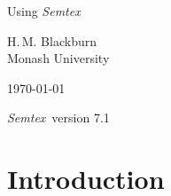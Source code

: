 \documentclass[11pt,a4paper]{report}
\newcommand{\Semtex}{\emph{Semtex}}
\begin{document}
\begin{titlepage}
\centering

\vspace*{\fill}

{\huge Using \Semtex}

\vspace{\fill}

\begin{figure}[h]
\begin{center}
\end{center}
\end{figure}

\vspace{\fill}

{\large H.\,M. Blackburn}\\
Monash University

\vspace{\fill}

\today

\Semtex\ version 7.1

\vspace*{\fill}

\end{titlepage}


\tableofcontents

\clearpage

\chapter{Introduction}
\end{document}
